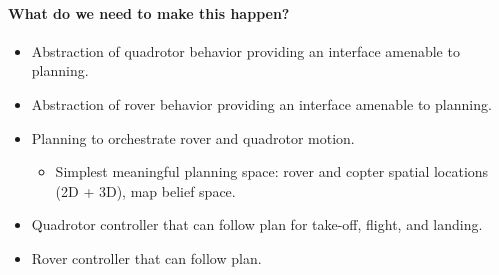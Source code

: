 \documentclass[conference]{IEEEtran}
\begin{document}
\paragraph{What do we need to make this happen?}

\begin{itemize}
  \item Abstraction of quadrotor behavior providing an interface amenable to planning.
  \item Abstraction of rover behavior providing an interface amenable to planning.
  \item Planning to orchestrate rover and quadrotor motion.
  \begin{itemize}
    \item Simplest meaningful planning space: rover and copter spatial locations (2D + 3D), map belief space.
  \end{itemize}
  \item Quadrotor controller that can follow plan for take-off, flight, and landing.
  \item Rover controller that can follow plan.
\end{itemize}
\end{document}
